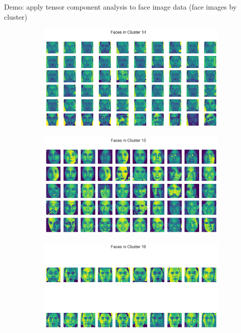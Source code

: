 \documentclass[xcolor={dvipsnames,svgnames}]{beamer}
\begin{document}
\begin{frame}{Demo: apply tensor component analysis to face image data (face images by cluster)}
      \begin{figure}[H]
            \centering
            \begin{subfigure}[b]{0.45\textwidth}
                \includegraphics[width=\textwidth]{figures-face-results/face14.png}
            \end{subfigure}
            \hfill 
            \begin{subfigure}[b]{0.45\textwidth}
                \includegraphics[width=\textwidth]{figures-face-results/face15.png}
            \end{subfigure}
            \hfill
            \begin{subfigure}[b]{0.45\textwidth}
                \includegraphics[width=\textwidth]{figures-face-results/face16.png}

\end{subfigure}
\end{figure}
\end{frame}
\end{document}
